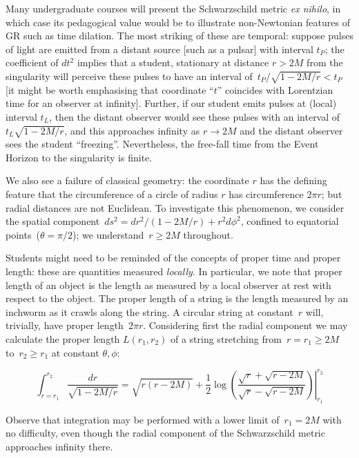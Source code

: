 \documentclass[review]{elsarticle}
\begin{document}
Many undergraduate courses will present the Schwarzschild metric {\em
  ex nihilo}, in which case its pedagogical value would be to
illustrate non-Newtonian features of GR such as time dilation.  The
most striking of these are temporal: suppose pulses of light are
emitted from a distant source [such as a pulsar] with interval $t_P$;
the coefficient of $dt^2$ implies that a student, stationary at
distance $r>2M$ from the singularity will perceive these pulses to
have an interval of~$t_P/\sqrt{1-2M/r} < t_P$ [it might be worth
  emphasising that coordinate ``$t$'' coincides with Lorentzian time
  for an observer at infinity].  Further, if our student emits pulses
at (local) interval $t_L$, then the distant observer would see these
pulses with an interval of $t_L\sqrt{1-2M/r}$, and this approaches
infinity as $r\longrightarrow 2M$ and the distant observer sees the
student ``freezing''.  Nevertheless, the free-fall time from the Event
Horizon to the singularity is finite.

We also see a failure of classical geometry: the coordinate $r$ has
the defining feature that the circumference of a circle of radius $r$
has circumference $2\pi r$; but radial distances are not Euclidean.
To investigate this phenomenon, we consider the spatial
component~$ds^2= dr^2/\left(1-2M/r\right) + r^2d\phi^2$, confined to
equatorial points~($\theta=\pi/2$); we understand~$r\geqslant 2M$
throughout.

Students might need to be reminded of the concepts of proper time and
proper length: these are quantities measured {\em locally}.  In
particular, we note that proper length of an object is the length as
measured by a local observer at rest with respect to the object.  The
proper length of a string is the length measured by an inchworm as it
crawls along the string.  A circular string at constant~$r$ will,
trivially, have proper length~$2\pi r$.  Considering first the radial
component we may calculate the proper length $L\left(r_1,r_2\right)$
of a string stretching from~$r=r_1\geqslant 2M$ to~$r_2\geqslant r_1$
at constant $\theta,\phi$:

\begin{equation}\label{radial_string_length}
  \int_{r=r_1}^{r_2}\frac{dr}{\sqrt{1-2M/r}}=
  \left.
  \sqrt{r(r-2M)} +\frac{1}{2}\log\left(
  \frac{\sqrt{r}+\sqrt{r-2M}}{\sqrt{r}-\sqrt{r-2M}}\right)
  \right|_{r_1}^{r_2}
  \end{equation}

Observe that integration may be performed with a lower limit
of~$r_1=2M$ with no difficulty, even though the radial component of the
Schwarzschild metric approaches infinity there.
\end{document}
